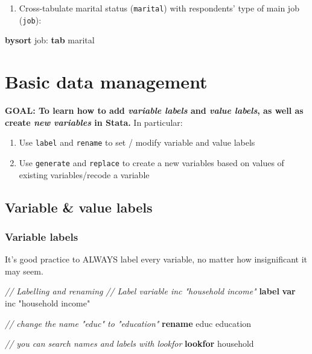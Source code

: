 \documentclass[
]{book}
\newenvironment{Shaded}{\begin{snugshade}}{\end{snugshade}}
\newcommand{\CommentTok}[1]{\textcolor[rgb]{0.56,0.35,0.01}{\textit{#1}}}
\newcommand{\KeywordTok}[1]{\textcolor[rgb]{0.13,0.29,0.53}{\textbf{#1}}}
\newcommand{\NormalTok}[1]{#1}
\newcommand{\StringTok}[1]{\textcolor[rgb]{0.31,0.60,0.02}{#1}}
\providecommand{\tightlist}{%
  \setlength{\itemsep}{0pt}\setlength{\parskip}{0pt}}
\begin{document}
\begin{enumerate}
\def\labelenumi{\arabic{enumi}.}
\setcounter{enumi}{4}
\tightlist
\item
  Cross-tabulate marital status (\texttt{marital}) with respondents' type of main job (\texttt{job}):
\end{enumerate}

\begin{Shaded}
\begin{Highlighting}[]
\KeywordTok{bysort}\NormalTok{ job: }\KeywordTok{tab}\NormalTok{ marital  }
\end{Highlighting}
\end{Shaded}

\hypertarget{basic-data-management}{%
\section{Basic data management}\label{basic-data-management}}

\textbf{GOAL: To learn how to add \emph{variable labels} and \emph{value labels}, as well as create \emph{new variables} in Stata.} In particular:

\begin{enumerate}
\def\labelenumi{\arabic{enumi}.}
\tightlist
\item
  Use \texttt{label} and \texttt{rename} to set / modify variable and value labels
\item
  Use \texttt{generate} and \texttt{replace} to create a new variables based on values of existing variables/recode a variable
\end{enumerate}

\hypertarget{variable-value-labels}{%
\subsection{Variable \& value labels}\label{variable-value-labels}}

\hypertarget{variable-labels}{%
\subsubsection{Variable labels}\label{variable-labels}}

It's good practice to ALWAYS label every variable, no matter how insignificant it may seem.

\begin{Shaded}
\begin{Highlighting}[]
\CommentTok{// Labelling and renaming }
\CommentTok{// Label variable inc "household income"}
\KeywordTok{label} \KeywordTok{var}\NormalTok{ inc }\StringTok{"household income"}

\CommentTok{// change the name "educ" to "education"}
\KeywordTok{rename}\NormalTok{ educ education}

\CommentTok{// you can search names and labels with \textasciigrave{}lookfor\textasciigrave{}}
\KeywordTok{lookfor}\NormalTok{ household}
\end{Highlighting}
\end{Shaded}
\end{document}
